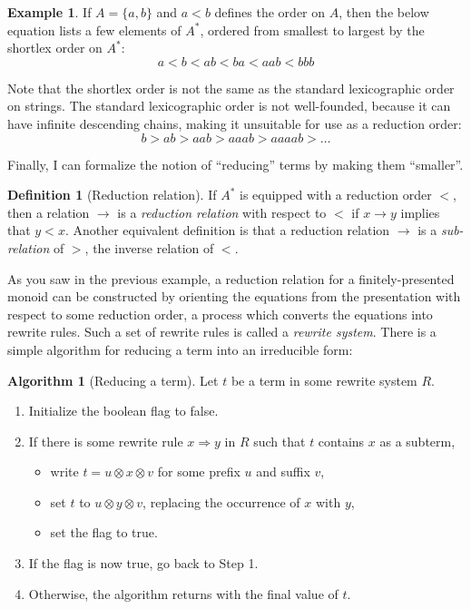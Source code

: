 \documentclass[headsepline,bibliography=totoc]{scrreport}
\theoremstyle{definition}
\newtheorem{example}{Example}[chapter]
\theoremstyle{definition}
\newtheorem{definition}{Definition}[chapter]
\theoremstyle{definition}
\newtheorem{algorithm}{Algorithm}[chapter]
\begin{document}
\begin{example} If $A=\{a,b\}$ and $a<b$ defines the order on $A$, then the below equation lists a few elements of $A^*$, ordered from smallest to largest by the shortlex order on $A^*$:
\[a<b<ab<ba<aab<bbb\]
\end{example}

Note that the shortlex order is not the same as the standard lexicographic order on strings. The standard lexicographic order is not well-founded, because it can have infinite descending chains, making it unsuitable for use as a reduction order:
\[b>ab>aab>aaab>aaaab>\ldots\]

Finally, I can formalize the notion of ``reducing'' terms by making them ``smaller''.
\begin{definition}[Reduction relation]\label{transinvdef} If $A^*$ is equipped with a reduction order $<$, then a relation $\rightarrow$ is a \emph{reduction relation} with respect to $<$ if $x\rightarrow y$ implies that $y<x$. Another equivalent definition is that a reduction relation $\rightarrow$ is a \emph{sub-relation} of $>$, the inverse relation of $<$. 
\end{definition}
As you saw in the previous example, a reduction relation for a finitely-presented monoid can be constructed by orienting the equations from the presentation with respect to some reduction order, a process which converts the equations into rewrite rules. Such a set of rewrite rules is called a \emph{rewrite system}. There is a simple algorithm for reducing a term into an irreducible form:
\begin{algorithm}[Reducing a term]\label{reducingaterm} Let $t$ be a term in some rewrite system $R$.
\begin{enumerate}
\item Initialize the boolean flag to false.
\item If there is some rewrite rule $x\Rightarrow y$ in $R$ such that $t$ contains $x$ as a subterm,
\begin{itemize}
\item write $t=u\otimes x\otimes v$ for some prefix $u$ and suffix $v$,
\item set $t$ to $u\otimes y\otimes v$, replacing the occurrence of $x$ with $y$,
\item set the flag to true.
\end{itemize}
\item If the flag is now true, go back to Step 1.
\item Otherwise, the algorithm returns with the final value of $t$.
\end{enumerate}
\end{algorithm}
\end{document}
